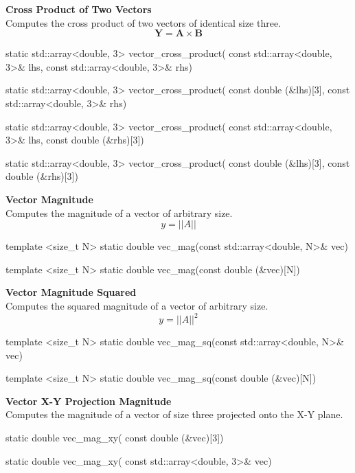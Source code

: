 \documentclass[11pt,fleqn]{report}
\begin{document}
\textbf{Cross Product of Two Vectors}\\
Computes the cross product of two vectors of identical size three.
\begin{equation*}
\textbf{Y} = \textbf{A} \times \textbf{B}
\end{equation*}
\begin{code}
static std::array<double, 3> vector_cross_product(
                                        const std::array<double, 3>& lhs,
                                        const std::array<double, 3>& rhs)

static std::array<double, 3> vector_cross_product(
                                        const double (&lhs)[3],
                                        const std::array<double, 3>& rhs)

static std::array<double, 3> vector_cross_product(
                                        const std::array<double, 3>& lhs,
                                        const double (&rhs)[3])

static std::array<double, 3> vector_cross_product(
                                        const double (&lhs)[3],
                                        const double (&rhs)[3])
\end{code}

\textbf{Vector Magnitude}\\
Computes the magnitude of a vector of arbitrary size.
\begin{equation*}
y = ||A||
\end{equation*}
\begin{code}
template <size_t N>
static double vec_mag(const std::array<double, N>& vec)

template <size_t N>
static double vec_mag(const double (&vec)[N])
\end{code}

\textbf{Vector Magnitude Squared}\\
Computes the squared magnitude of a vector of arbitrary size.
\begin{equation*}
y = ||A||^2
\end{equation*}
\begin{code}
template <size_t N>
static double vec_mag_sq(const std::array<double, N>& vec)

template <size_t N>
static double vec_mag_sq(const double (&vec)[N])
\end{code}

\textbf{Vector X-Y Projection Magnitude}\\
Computes the magnitude of a vector of size three projected onto the X-Y plane.
\begin{code}
static double vec_mag_xy( const double (&vec)[3])

static double vec_mag_xy( const std::array<double, 3>& vec)
\end{code}
\end{document}
